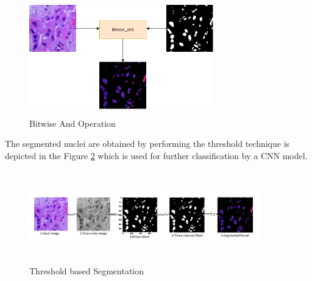 \documentclass[conference]{IEEEtran}
\begin{document}
\begin{figure}[htbp]
\centerline{\includegraphics[width=8cm, height=5cm]{./figures/result.png}}
\caption{Bitwise And Operation}
\label{result}
\end{figure}

The segmented nuclei are obtained by performing the threshold technique is depicted in the Figure \ref{threseg} which is used for further classification by a CNN model.
\begin{figure}[htbp]
\centerline{\includegraphics[width=10cm, height=4cm]{./figures/threseg.png}}
\caption{Threshold based Segmentation}
\label{threseg}
\end{figure}
\end{document}
